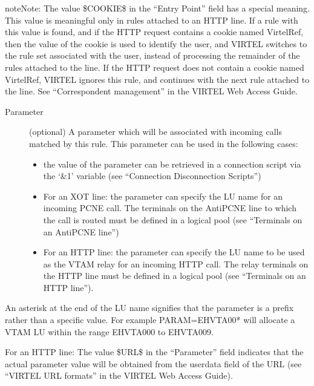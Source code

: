\documentclass[letterpaper,10pt,english]{sphinxmanual}
\begin{document}
\begin{sphinxadmonition}{note}{Note:}
The value \$COOKIE\$ in the “Entry Point” field has a special meaning. This value is meaningful only in rules attached to an HTTP line. If a rule with this value is found, and if the HTTP request contains a cookie named VirtelRef, then the value of the cookie is used to identify the user, and VIRTEL switches to the rule set associated with the user, instead of processing the remainder of the rules attached to the line. If the HTTP request does not contain a cookie named VirtelRef, VIRTEL ignores this rule, and continues with the next rule attached to the line. See “Correspondent management” in the VIRTEL Web Access Guide.
\end{sphinxadmonition}
\begin{description}
\item[{Parameter}] \leavevmode
(optional) A parameter which will be associated with incoming calls matched by this rule. This parameter can be used in the following cases:
\begin{itemize}
\item {} 
the value of the parameter can be retrieved in a connection script via the ‘\&1’ variable (see “Connection \textendash{} Disconnection Scripts”)

\item {} 
For an XOT line: the parameter can specify the LU name for an incoming PCNE call. The terminals on the AntiPCNE line to which the call is routed must be defined in a logical pool (see “Terminals on an AntiPCNE line”)

\item {} 
For an HTTP line: the parameter can specify the LU name to be used as the VTAM relay for an incoming HTTP call. The relay terminals on the HTTP line must be defined in a logical pool (see “Terminals on an HTTP line”).

\end{itemize}

\end{description}

An asterisk at the end of the LU name signifies that the parameter is a prefix rather than a specific value. For example PARAM=EHVTA00* will allocate a VTAM LU within the range EHVTA000 to EHVTA009.

For an HTTP line: The value \$URL\$ in the “Parameter” field indicates that the actual parameter value will be obtained
from the userdata field of the URL (see “VIRTEL URL formats” in the VIRTEL Web Access Guide).
\end{document}
